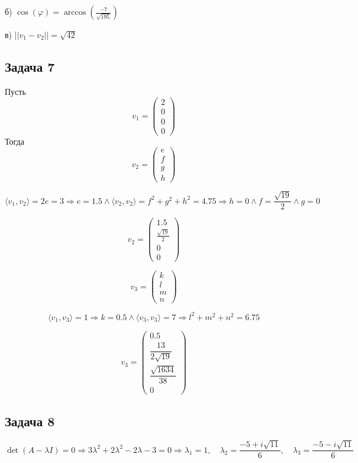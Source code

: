 \documentclass[a4paper,12pt]{article}
\begin{document}
б) \( \cos(\varphi) = \arccos\left(\frac{-7}{\sqrt{195}}\right) \)

в) \( ||v_1 - v_2|| = \sqrt{42} \)

\subsection{Задача 7}

Пусть 
\[
v_1 = \begin{pmatrix}
    2 \\ 0 \\ 0 \\ 0
\end{pmatrix}
\]
Тогда 
\[
v_2 = \begin{pmatrix}
    e \\ f \\ g \\ h
\end{pmatrix}
\]

\[
\langle v_1, v_2 \rangle = 2e = 3 \Rightarrow e = 1.5 \land \langle v_2, v_2 \rangle = f^2 + g^2 + h^2 = 4.75 \Rightarrow h = 0 \land f = \frac{\sqrt{19}}{2} \land g = 0
\]

\[
v_2 = \begin{pmatrix}
    1.5 \\ \frac{\sqrt{19}}{2} \\ 0 \\ 0
\end{pmatrix}
\]

\[
v_3 = \begin{pmatrix}
    k \\ l \\ m \\ n
\end{pmatrix}
\]

\[
\langle v_1, v_3 \rangle = 1 \Rightarrow k = 0.5 \land \langle v_3, v_3 \rangle = 7 \Rightarrow l^2 + m^2 + n^2 = 6.75
\]

\[
v_3 = \begin{pmatrix} 0.5 \\ \dfrac{13}{2\sqrt{19}} \\ \dfrac{\sqrt{1634}}{38} \\ 0 \end{pmatrix}
\]

\subsection{Задача 8}

\[
\det(A-\lambda I) = 0 \Rightarrow 3\lambda^2 +2\lambda^2 -2\lambda - 3 = 0 \Rightarrow \lambda_1 = 1, \quad \lambda_2 = \dfrac{-5 + i\sqrt{11}}{6}, \quad \lambda_3 = \dfrac{-5 - i\sqrt{11}}{6}
\]
\end{document}
